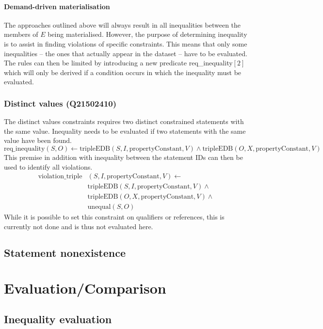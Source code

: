 \documentclass[hyperref,bachelorofscience,fleqn]{cgvpub}
\begin{document}
\subsubsection{Demand-driven materialisation}
The approaches outlined above will always result in all inequalities between the members of \(E\) being materialised. However, the purpose of determining inequality is to assist in finding violations of specific constraints. This means that only some inequalities -- the ones that actually appear in the dataset -- have to be evaluated. The rules can then be limited by introducing a new predicate req\_inequality\([2]\) which will only be derived if a condition occurs in which the inequality must be evaluated.\\

\subsection{Distinct values (Q21502410)}
The distinct values constraints requires two distinct constrained statements with the same value. Inequality needs to be evaluated if two statements with the same value have been found.
\begin{equation*}
\text{req\_inequality}(S, O) \leftarrow \text{tripleEDB}(S, I, \text{propertyConstant}, V) \wedge \text{tripleEDB}(O, X, \text{propertyConstant}, V)
\end{equation*}
This premise in addition with inequality between the statement IDs can then be used to identify all violations.
\begin{equation*}
\begin{split}
\text{violation\_triple}&(S, I, \text{propertyConstant}, V) \leftarrow \\
&\text{tripleEDB}(S, I, \text{propertyConstant}, V) \wedge \\
&\text{tripleEDB}(O, X, \text{propertyConstant}, V) \wedge \\
&\text{unequal}(S, O)
\end{split}
\end{equation*}
While it is possible to set this constraint on qualifiers or references, this is currently not done and is thus not evaluated here.

\section{Statement nonexistence}\label{sec_statement_nonexistence}


\chapter{Evaluation/Comparison}

\section{Inequality evaluation}\label{sec_inequality_evaluation}
\end{document}
